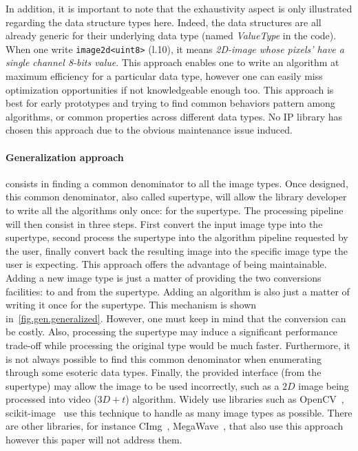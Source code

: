 In addition, it is important to note that the exhaustivity aspect is only illustrated regarding the data structure types
here. Indeed, the data structures are all already generic for their underlying data type (named \emph{ValueType} in the
code). When one write \texttt{image2d<uint8>} (l.10), it means \emph{2D-image whose pixels' have a single channel 8-bits
  value}. This approach enables one to write an algorithm at maximum efficiency for a particular data type, however one
can easily miss optimization opportunities if not knowledgeable enough too. This approach is best for early prototypes
and trying to find common behaviors pattern among algorithms, or common properties across different data types. No IP
library has chosen this approach due to the obvious maintenance issue induced.

\paragraph{Generalization approach} consists in finding a common denominator to all the image types. Once designed, this
common denominator, also called supertype, will allow the library developer to write all the algorithms only once: for
the supertype. The processing pipeline will then consist in three steps. First convert the input image type into the
supertype, second process the supertype into the algorithm pipeline requested by the user, finally convert back the
resulting image into the specific image type the user is expecting. This approach offers the advantage of being
maintainable. Adding a new image type is just a matter of providing the two conversions facilities: to and from the
supertype. Adding an algorithm is also just a matter of writing it once for the supertype. This mechanism is shown
in~\ref{fig.gen.generalized}. However, one must keep in mind that the conversion can be costly. Also, processing the
supertype may induce a significant performance trade-off while processing the original type would be much faster.
Furthermore, it is not always possible to find this common denominator when enumerating through some esoteric data
types. Finally, the provided interface (from the supertype) may allow the image to be used incorrectly, such as a $2D$
image being processed into video ($3D+t$) algorithm. Widely use libraries such as
OpenCV~\cite{bradski.2000.opencv}, scikit-image~\cite{vanderwalt.2014.skimage} use this technique to handle as many
image types as possible. There are other libraries, for instance CImg~\cite{tschumperle.2012.cimg},
MegaWave~\cite{froment.2012.megawave}, that also use this approach however this paper will not address them.

